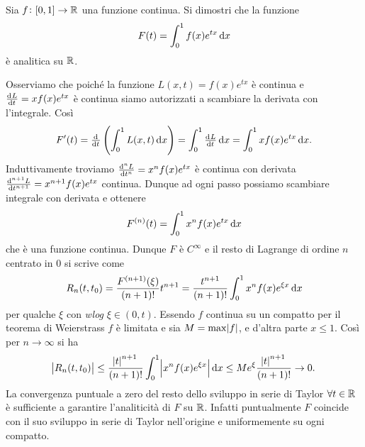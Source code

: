 \begin{vares}
  Sia $ f \colon [0, 1] \to \mathbb{R} $ una funzione continua. Si dimostri che la funzione \[F(t) = \int_{0}^{1} f(x) e^{tx} \dif{x}\] è analitica su $ \mathbb{R} $.
\end{vares}
%
Osserviamo che poiché la funzione $ L(x, t) = f(x) e^{tx} $ è continua e $ \od[]{L}{t} = x f(x) e^{tx} $ è continua siamo autorizzati a scambiare la derivata con l'integrale. Così \[F'(t) = \od[]{}{t} \left(\int_{0}^{1} L(x, t) \dif{x}\right) = \int_{0}^{1} \od[]{L}{t}  \dif{x} = \int_{0}^{1} x f(x) e^{tx} \dif{x}. \] Induttivamente troviamo $ \od[n]{L}{t} = x^n f(x) e^{tx} $ è continua con derivata $ \od[n +1]{L}{t} = x^{n + 1} f(x) e^{tx} $ continua. Dunque ad ogni passo possiamo scambiare integrale con derivata e ottenere \[F^{(n)}(t) = \int_{0}^{1} x^n f(x) e^{tx} \dif{x}\] che è una funzione continua. Dunque $ F $ è $ C^{\infty} $ e il resto di Lagrange di ordine $ n $ centrato in $ 0 $ si scrive come \[R_n(t, t_0) = \frac{F^{(n + 1)}(\xi)}{(n + 1)!} t^{n + 1} = \frac{t^{n + 1}}{(n + 1)!} \int_{0}^{1} x^n f(x) e^{\xi x} \dif{x}\] per qualche $ \xi $ con \emph{wlog} $ \xi \in (0, t) $. Essendo $ f $ continua su un compatto per il teorema di Weierstrass $ f $ è limitata e sia $ M = \max{\abs{f}} $, e d'altra parte $ x \leq 1 $. Così per $ n \to \infty $ si ha
\begin{equation*}
  \abs{R_n(t, t_0)} \leq \frac{{\abs{t}}^{n + 1}}{(n + 1)!} \int_{0}^{1} \abs{x^n f(x) e^{\xi x}} \dif{x} \leq M e^{\xi} \frac{{\abs{t}}^{n + 1}}{(n + 1)!} \to 0.
\end{equation*}
La convergenza puntuale a zero del resto dello sviluppo in serie di Taylor $ \forall t \in \mathbb{R} $ è sufficiente a garantire l'analiticità di $ F $ su $ \mathbb{R} $. Infatti puntualmente $ F $ coincide con il suo sviluppo in serie di Taylor nell'origine e uniformemente su ogni compatto.

